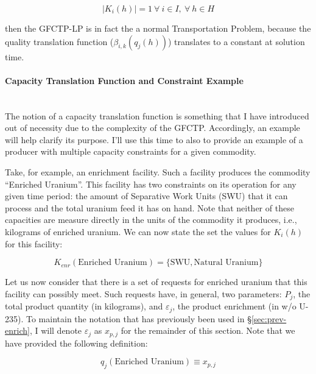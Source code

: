 \begin{equation}\label{eqs:1constraint}
  \left|{K_{i}(h)}\right| = 1 \: \forall \: i \in I, \: \forall \: h \in H
\end{equation}

then the GFCTP-LP is in fact the a normal Transportation Problem, because the
quality translation function ($\beta_{i,k}(q_{j}(h))$) translates to a constant
at solution time.

\paragraph{Capacity Translation Function and Constraint Example}~\\

The notion of a capacity translation function is something that I have
introduced out of necessity due to the complexity of the GFCTP. Accordingly, an
example will help clarify its purpose. I'll use this time to also to provide an
example of a producer with multiple capacity constraints for a given commodity.

Take, for example, an enrichment facility. Such a facility produces the
commodity ``Enriched Uranium''. This facility has two constraints on its
operation for any given time period: the amount of Separative Work Units (SWU)
that it can process and the total uranium feed it has on hand. Note that neither
of these capacities are measure directly in the units of the commodity it
produces, i.e., kilograms of enriched uranium. We can now state the set the
values for $K_{i}(h)$ for this facility:

\begin{equation}\label{eqs:enr-constr-commods}
  K_{enr}(\mbox{Enriched Uranium}) = \{ \mbox{SWU}, \mbox{Natural Uranium} \}
\end{equation}

Let us now consider that there is a set of requests for enriched uranium that
this facility can possibly meet. Such requests have, in general, two parameters:
$P_{j}$, the total product quantity (in kilograms), and $\varepsilon_{j}$, the
product enrichment (in w/o U-235). To maintain the notation that has previously
been used in \S\ref{sec:prev-enrich}, I will denote $\varepsilon_{j}$ as
$x_{p,j}$ for the remainder of this section. Note that we have provided the
following definition:

\begin{equation}\label{eqs:enr-q-swu}
  q_{j}(\mbox{Enriched Uranium}) \equiv x_{p,j}
\end{equation}

